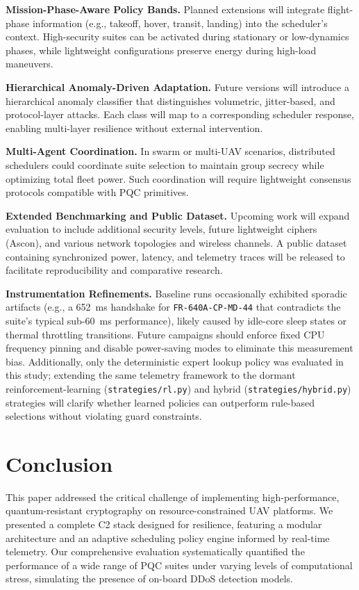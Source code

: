 \documentclass[sigconf,natbib=false]{acmart}
\begin{document}
\textbf{Mission-Phase-Aware Policy Bands.} Planned extensions will integrate flight-phase information (e.g., takeoff, hover, transit, landing) into the scheduler's context. High-security suites can be activated during stationary or low-dynamics phases, while lightweight configurations preserve energy during high-load maneuvers.

\textbf{Hierarchical Anomaly-Driven Adaptation.} Future versions will introduce a hierarchical anomaly classifier that distinguishes volumetric, jitter-based, and protocol-layer attacks. Each class will map to a corresponding scheduler response, enabling multi-layer resilience without external intervention.

\textbf{Multi-Agent Coordination.} In swarm or multi-UAV scenarios, distributed schedulers could coordinate suite selection to maintain group secrecy while optimizing total fleet power. Such coordination will require lightweight consensus protocols compatible with PQC primitives.

\textbf{Extended Benchmarking and Public Dataset.} Upcoming work will expand evaluation to include additional security levels, future lightweight ciphers (Ascon), and various network topologies and wireless channels. A public dataset containing synchronized power, latency, and telemetry traces will be released to facilitate reproducibility and comparative research.

\textbf{Instrumentation Refinements.} Baseline runs occasionally exhibited sporadic artifacts (e.g., a 652~ms handshake for \texttt{FR-640A-CP-MD-44} that contradicts the suite's typical sub-60~ms performance), likely caused by idle-core sleep states or thermal throttling transitions. Future campaigns should enforce fixed CPU frequency pinning and disable power-saving modes to eliminate this measurement bias. Additionally, only the deterministic expert lookup policy was evaluated in this study; extending the same telemetry framework to the dormant reinforcement-learning (\texttt{strategies/rl.py}) and hybrid (\texttt{strategies/hybrid.py}) strategies will clarify whether learned policies can outperform rule-based selections without violating guard constraints.

\section{Conclusion}

This paper addressed the critical challenge of implementing high-performance, quantum-resistant cryptography on resource-constrained UAV platforms. We presented a complete C2 stack designed for resilience, featuring a modular architecture and an adaptive scheduling policy engine informed by real-time telemetry. Our comprehensive evaluation systematically quantified the performance of a wide range of PQC suites under varying levels of computational stress, simulating the presence of on-board DDoS detection models.
\end{document}
